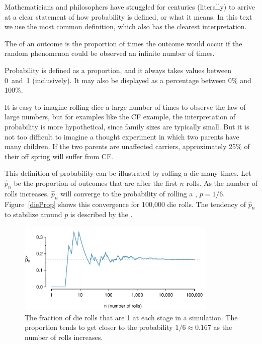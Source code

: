 Mathematicians and philosophers have struggled for centuries (literally) to arrive at a clear statement of how probability is defined, or what it means.  In this text we use the most common definition, which also has the clearest interpretation.

\begin{termBox}{
The  of an outcome is the proportion of times the outcome would occur if the random phenomenon could be observed an infinite number of times.}
\end{termBox}

Probability is defined as a proportion, and it always takes values between 0~and~1 (inclusively). It may also be displayed as a percentage between 0\% and 100\%.

It is easy to imagine rolling dice a large number of times to observe the law of large numbers, but for examples like the CF example, the interpretation of probability is more hypothetical, since family sizes are typically small.  But it is not too difficult to imagine a thought experiment in which two parents have many children.  If the two parents are unaffected carriers, approximately 25\% of their off spring will suffer from CF.

This definition of probability can be illustrated by rolling a die many times. Let $\hat{p}_n$ be the proportion of outcomes that are  after the first $n$ rolls. As the number of rolls increases, $\hat{p}_n$ will converge to the probability of rolling a , $p = 1/6$. Figure~\ref{dieProp} shows this convergence for 100,000 die rolls. The tendency of $\hat{p}_n$ to stabilize around $p$ is described by the . 

\begin{figure}[bt]
\centering
\includegraphics[width=0.85\textwidth]{ch_probability_oi_biostat/figures/dieProp/dieProp}
\caption{The fraction of die rolls that are 1 at each stage in a simulation. The proportion tends to get closer to the probability $1/6 \approx 0.167$ as the number of rolls increases.}
\label{fig:dieProp}
\end{figure}


